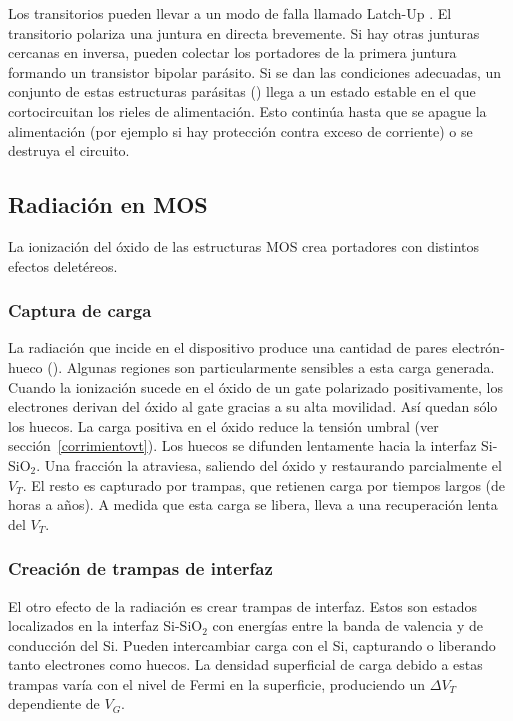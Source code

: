 Los transitorios pueden llevar a un modo de falla llamado Latch-Up
\cite{gregory_latch-up_1973}.
El transitorio polariza una juntura en directa brevemente.
Si hay otras junturas cercanas en inversa,
pueden colectar los portadores de la primera juntura 
formando un transistor bipolar parásito.
Si se dan las condiciones adecuadas,
un conjunto de estas estructuras parásitas ()
llega a un estado estable
en el que cortocircuitan los rieles de alimentación.
Esto continúa hasta que se apague la alimentación 
(por ejemplo si hay protección contra exceso de corriente)
o se destruya el circuito.
\subsection{Radiación en MOS}
La ionización del óxido de las estructuras MOS crea portadores 
con distintos efectos deletéreos. 
\subsubsection{Captura de carga}
La radiación que incide en el dispositivo 
produce una cantidad de pares electrón-hueco ().
Algunas regiones son particularmente sensibles a esta carga generada.
Cuando la ionización sucede en el óxido de un gate polarizado positivamente,
los electrones derivan del óxido al gate gracias a su alta movilidad.
Así quedan sólo los huecos.
La carga positiva en el óxido reduce la tensión umbral 
(ver sección~\ref{corrimientovt}).
Los huecos se difunden lentamente hacia la interfaz Si-SiO$_2$.
Una fracción la atraviesa, 
saliendo del óxido y restaurando parcialmente el $V_T$.
El resto es capturado por trampas,
que retienen carga por tiempos largos (de horas a años).
A medida que esta carga se libera, 
lleva a una recuperación lenta del $V_T$.
\subsubsection{Creación de trampas de interfaz}
El otro efecto de la radiación es crear trampas de interfaz.
Estos son estados localizados en la interfaz Si-SiO$_2$ con
energías entre la banda de valencia y de conducción del Si.
Pueden intercambiar carga con el Si,
capturando o liberando tanto electrones como huecos.
La densidad superficial de carga debido a estas trampas varía con el nivel de
Fermi en la superficie, produciendo un $\Delta V_T$ dependiente de $V_G$.
